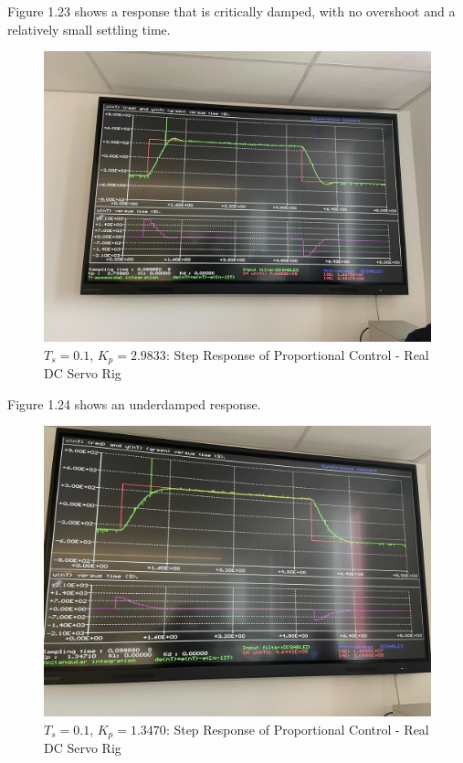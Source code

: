 \documentclass[stu, a4paper, 12pt, floatsintext]{apa7}
\numberwithin{figure}{section}
\numberwithin{table}{section}
\numberwithin{equation}{section}
\begin{document}
Figure 1.23 shows a response that is critically damped, with no overshoot and a relatively small settling time.
\begin{figure}[H]
    \caption{$T_s = 0.1$, $K_p = 2.9833$: Step Response of Proportional Control - Real DC Servo Rig}
    \label{fig:0.1_Ts_step4_step_response_1}
    \centering
    \includegraphics[width=1.1\textwidth]{pictures/task4_kp_0.1_1}
\end{figure}
Figure 1.24 shows an underdamped response. 
\begin{figure}[H]
    \caption{$T_s = 0.1$, $K_p = 1.3470$: Step Response of Proportional Control - Real DC Servo Rig}
    \label{fig:0.1_Ts_step4_step_response_2}
    \centering
    \includegraphics[width=1.1\textwidth]{pictures/task4_kp_0.1_2}
\end{figure}
\end{document}
